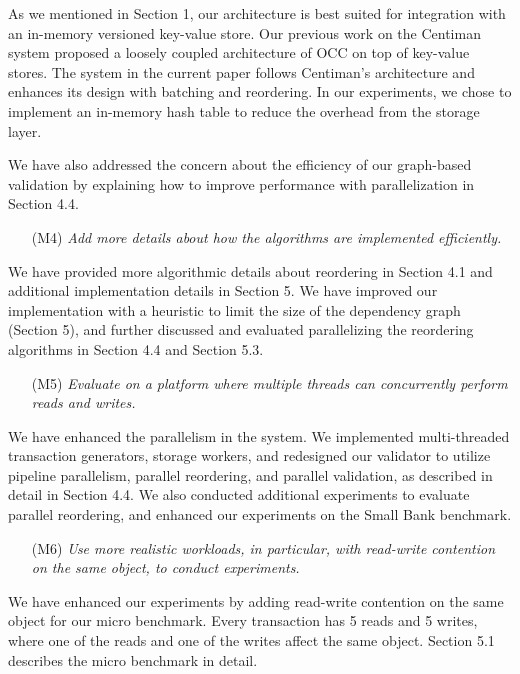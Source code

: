 \documentclass{article}
\begin{document}
As we mentioned in Section 1, our architecture is best suited for integration with an in-memory versioned key-value store. Our previous work on the Centiman system proposed a loosely coupled architecture of OCC on top of key-value stores. The system in the current paper follows Centiman's architecture and enhances its design with batching and reordering. In our experiments, we chose to implement an in-memory hash table to reduce the overhead from the storage layer.

We have also addressed the concern about the efficiency of our graph-based validation by explaining how to improve performance with parallelization in Section 4.4. 

\begin{itemize}
\item[(M4)]  \emph{Add more details about how the algorithms are implemented efficiently.}
\end{itemize}
\vspace{-1em}
We have provided more algorithmic details about reordering in Section 4.1 and additional implementation details in Section 5. We have improved our implementation with a heuristic to limit the size of the dependency graph (Section 5), and further discussed and evaluated parallelizing the reordering algorithms in Section 4.4 and Section 5.3. 

\begin{itemize}
\item[(M5)]  \emph{Evaluate on a platform where multiple threads can concurrently perform reads and writes.}
\end{itemize}
\vspace{-1em}
We have enhanced the parallelism in the system. We implemented multi-threaded transaction generators, storage workers, and redesigned our validator to utilize pipeline parallelism, parallel reordering, and parallel validation, as described in detail in Section 4.4. We also conducted additional experiments to evaluate parallel reordering, and enhanced our experiments on the Small Bank benchmark.

\begin{itemize}
\item[(M6)] \emph{Use more realistic workloads, in particular, with read-write contention on the same object, to conduct experiments.}
\end{itemize}
\vspace{-1em}
We have enhanced our experiments by adding read-write contention on the same object for our micro benchmark. Every transaction has 5 reads and 5 writes, where one of the reads and one of the writes affect the same object. Section 5.1 describes the micro benchmark in detail.
\end{document}
